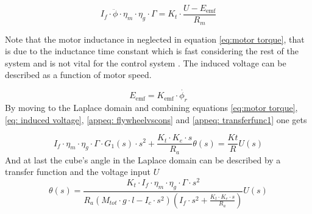 \documentclass[a4paper,11pt]{kth-mag}
\begin{document}
\begin{equation} \label{eq:motor torque}
I_f \cdot \ddot{\phi} \cdot \eta_m \cdot \eta_g \cdot \Gamma = K_t \cdot \frac{U-E_{\text{emf}} }{R_m}
\end{equation}

Note that the motor inductance in neglected in equation \eqref{eq:motor torque}, that is due to the inductance time constant which is fast considering the rest of the system and is not vital for the control system \cite{KTHpendulum}.
The induced voltage can be described as a function of motor speed.

\begin{equation} \label{eq: induced voltage}
E_{\text{emf}} = K_{\text{emf}} \cdot \dot{\phi_r}
\end{equation}
By moving to the Laplace domain and combining equations \ref{eq:motor torque}, \ref{eq: induced voltage}, \ref{appeq: flywheelvscons} and \ref{appeq: transferfunc1} one gets

\begin{equation}
I_f \cdot \eta_m \cdot \eta_g \cdot \Gamma \cdot G_1(s) \cdot s^2 + \frac{K_t \cdot K_e \cdot s}{R_a} \theta(s) = \frac{Kt}{R} U(s)
\end{equation}
And at last the cube's angle in the Laplace domain can be described by a transfer function and the voltage input $U$
\begin{equation}
\theta(s) = \frac{K_t \cdot I_f \cdot \eta_m \cdot \eta_g \cdot \Gamma \cdot s^2}{R_a (M_{tot} \cdot g \cdot l - I_c \cdot s^2)(I_f \cdot s^2 + \frac{K_t \cdot K_e \cdot s}{R_a})} U(s)
\end{equation}



\cleardoublepage   
\cleartoverso %
%

\end{document}
